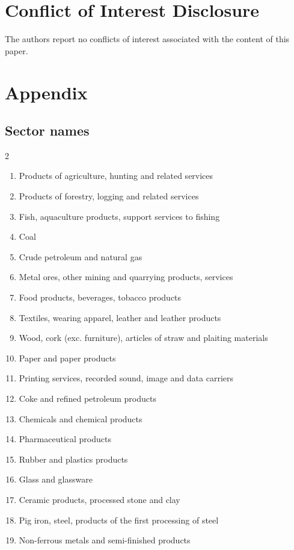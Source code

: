 \documentclass{article}
\begin{document}
\section*{Conflict of Interest Disclosure}

The authors report no conflicts of interest associated with the content of this paper.

\printbibliography
\newpage
\section*{Appendix}

\subsection*{Sector names}
\begin{multicols}{2}
\begin{enumerate}[leftmargin=*,itemsep=0pt,parsep=0pt]
\item Products of agriculture, hunting and related services
\item Products of forestry, logging and related services
\item Fish, aquaculture products, support services to fishing
\item Coal
\item Crude petroleum and natural gas
\item Metal ores, other mining and quarrying products, services
\item Food products, beverages, tobacco products
\item Textiles, wearing apparel, leather and leather products
\item Wood, cork (exc. furniture), articles of straw and plaiting materials
\item Paper and paper products
\item Printing services, recorded sound, image and data carriers
\item Coke and refined petroleum products
\item Chemicals and chemical products
\item Pharmaceutical products
\item Rubber and plastics products
\item Glass and glassware
\item Ceramic products, processed stone and clay
\item Pig iron, steel, products of the first processing of steel
\item Non-ferrous metals and semi-finished products

\end{enumerate}
\end{multicols}
\end{document}
